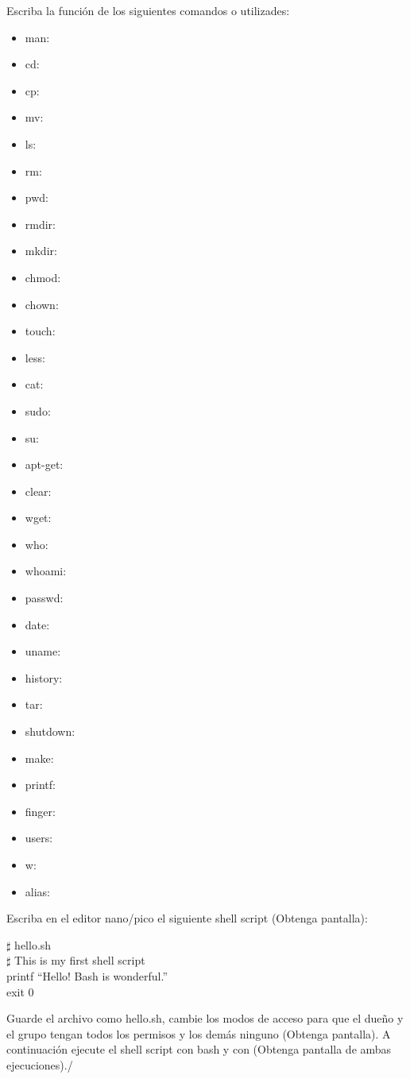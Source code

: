 	Escriba la funci\'on de los siguientes comandos o utilizades: 
			
			\begin{itemize}

				\item man:
				\item cd:
				\item cp:
				\item mv: 
				\item ls: 
				\item rm: 
				\item pwd:
				\item rmdir: 
				\item mkdir:
				\item chmod: 
				\item chown:
				\item touch:
				\item less:
				\item cat:
				\item sudo:
				\item su:
				\item apt-get:
				\item clear:
				\item wget:
				\item who:
				\item whoami:
				\item passwd:
				\item date:
				\item uname:
				\item history:
				\item tar:
				\item shutdown:
				\item make:	
				\item printf: 
				\item finger:
				\item users:
				\item w:
				\item alias:

			\end{itemize}

	Escriba en el editor nano/pico el siguiente shell script (Obtenga pantalla):
	
	\begin{flushleft}
		$\sharp$ hello.sh \\
		$\sharp$ This is my first shell script \\
		printf “Hello! Bash is wonderful.” \\
		exit 0
	\end{flushleft}

	Guarde el archivo como hello.sh, cambie los modos de acceso para que el dueño y el grupo tengan todos los permisos y los demás ninguno (Obtenga pantalla). A continuación ejecute el shell script con bash y con (Obtenga pantalla de ambas ejecuciones)./